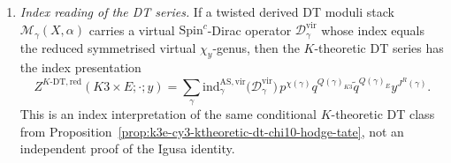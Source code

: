\begin{proposition}
\begin{enumerate}[label=\textup{(\roman*)}]
\[
H^3(K3\times E,\mathbb Z)
\cong H^2(K3,\mathbb Z)\otimes H^1(E,\mathbb Z)
\cong \mathbb Z^{44}
\]
is torsion-free. Hence a nonzero class
\(\eta_{K3}\otimes dz\) is not a torsion topological \(K\)-theory twist
and cannot be used as a Brauer class killing two \(K\)-theory generators.
A torsion Brauer twist \(\alpha\) may still define
\(D^b_c(X,\alpha)\), but it is extra input; no rank-\(46\) theorem follows
from the K\"unneth computation alone.
\item \emph{Index reading of the DT series.} If a twisted derived DT
moduli stack \(\mathcal M_\gamma(X,\alpha)\) carries a virtual
\(\mathrm{Spin}^c\)-Dirac operator \(\mathcal D_\gamma^{\mathrm{vir}}\)
whose index equals the reduced symmetrised virtual
\(\chi_y\)-genus, then the \(K\)-theoretic DT series has the index
presentation
\[
 Z^{K\text{-DT},\mathrm{red}}(K3\times E;\cdot;y)
 =
 \sum_{\gamma}\mathrm{ind}^{\mathrm{AS,vir}}_{\gamma}
 \bigl(\mathcal D_\gamma^{\mathrm{vir}}\bigr)\,
 p^{\chi(\gamma)}q^{Q(\gamma)_{K3}}\tilde q^{Q(\gamma)_{E}}y^{J^R(\gamma)}.
\]
This is an index interpretation of the same conditional
\(K\)-theoretic DT class from
Proposition~\ref{prop:k3e-cy3-ktheoretic-dt-chi10-hodge-tate}, not an
independent proof of the Igusa identity.
\end{enumerate}
\end{proposition}

